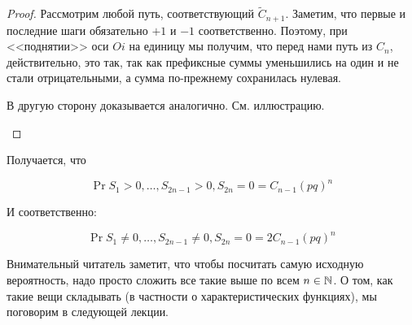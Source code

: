 \begin{proof}
  Рассмотрим любой путь, соответствующий $\tilde{C}_{n + 1}$. Заметим, что
  первые и последние шаги обязательно $+1$ и $-1$ соответственно. Поэтому, 
  при <<поднятии>> оси $Oi$ на единицу мы получим, что перед нами путь из $C_n$, 
  действительно, это так, так как префиксные суммы уменьшились на один и не стали 
  отрицательными, а сумма по-прежнему сохранилась нулевая.

  В другую сторону доказывается аналогично. См. иллюстрацию.

  \begin{center}
\end{center}
\end{proof}

Получается, что

\[
  \Pr{S_1 > 0, \ldots, S_{2n - 1} > 0, S_{2n} = 0} = C_{n - 1}(pq)^n
\]

И соответственно:

\[
  \Pr{S_1 \neq 0, \ldots, S_{2n - 1} \neq 0, S_{2n} = 0} = 2C_{n - 1}(pq)^n
\]

Внимательный читатель заметит, что чтобы посчитать самую исходную 
вероятность, надо просто сложить все такие выше по всем $n \in \mathbb{N}$.
О том, как такие вещи складывать (в частности о характеристических функциях), 
мы поговорим в следующей лекции.

